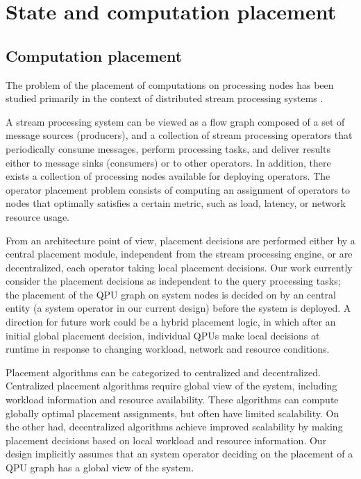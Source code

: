 \section{State and computation placement}
\label{sec:placement}
\subsection{Computation placement}
\label{sec:placement_computation}
The problem of the placement of computations on processing nodes has been studied primarily in the context of distributed
stream processing systems \cite{lakshmanan:placementstrategies}.

A stream processing system can be viewed as a flow graph composed of a set of message sources (producers),
and a collection of stream processing operators that periodically consume messages, perform processing tasks,
and deliver results either to message sinks (consumers) or to other operators.
In addition, there exists a collection of processing nodes available for deploying operators.
The operator placement problem consists of computing an assignment of operators to nodes that optimally satisfies a
certain metric, such as load, latency, or network resource usage.

From an architecture point of view, placement decisions are performed either by a central placement module, independent
from the stream processing engine, or are decentralized, each operator taking local placement decisions.
Our work currently consider the placement decisions as independent to the query processing tasks;
the placement of the QPU graph on system nodes is decided on by an central entity (a system operator in our current design)
before the system is deployed.
A direction for future work could be a hybrid placement logic, in which after an initial global placement decision,
individual QPUs make local decisions at runtime in response to changing workload, network and resource conditions.

Placement algorithms can be categorized to centralized and decentralized.
Centralized placement algorithms require global view of the system, including workload information and resource availability.
These algorithms can compute globally optimal placement assignments, but often have limited scalability.
On the other had, decentralized algorithms achieve improved scalability by making placement decisions based on local
workload and resource information.
Our design implicitly assumes that an system operator deciding on the placement of a QPU graph has a global view of the
system.

